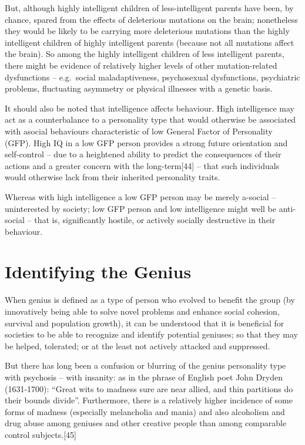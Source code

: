 \documentclass[
]{book}
\begin{document}
But, although highly intelligent children of less-intelligent parents have been, by chance, spared from the effects of deleterious mutations on the brain; nonetheless they would be likely to be carrying more deleterious mutations than the highly intelligent children of highly intelligent parents (because not all mutations affect the brain). So among the highly intelligent children of less intelligent parents, there might be evidence of relatively higher levels of other mutation-related dysfunctions -- e.g.~social maladaptiveness, psychosexual dysfunctions, psychiatric problems, fluctuating asymmetry or physical illnesses with a genetic basis.

It should also be noted that intelligence affects behaviour. High intelligence may act as a counterbalance to a personality type that would otherwise be associated with asocial behaviours characteristic of low General Factor of Personality (GFP). High IQ in a low GFP person provides a strong future orientation and self-control -- due to a heightened ability to predict the consequences of their actions and a greater concern with the long-term{[}44{]} -- that such individuals would otherwise lack from their inherited personality traits.

Whereas with high intelligence a low GFP person may be merely a-social --uninterested by society; low GFP person and low intelligence might well be anti-social -- that is, significantly hostile, or actively socially destructive in their behaviour.

\hypertarget{identifying-the-genius}{%
\chapter{Identifying the Genius}\label{identifying-the-genius}}

When genius is defined as a type of person who evolved to benefit the group (by innovatively being able to solve novel problems and enhance social cohesion, survival and population growth), it can be understood that it is beneficial for societies to be able to recognize and identify potential geniuses; so that they may be helped, tolerated; or at the least not actively attacked and suppressed.

But there has long been a confusion or blurring of the genius personality type with psychosis -- with insanity: as in the phrase of English poet John Dryden (1631-1700): ``Great wits to madness sure are near allied, and thin partitions do their bounds divide''. Furthermore, there is a relatively higher incidence of some forms of madness (especially melancholia and mania) and also alcoholism and drug abuse among geniuses and other creative people than among comparable control subjects.{[}45{]}
\end{document}

